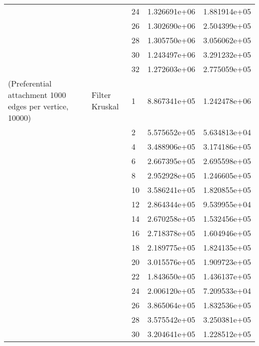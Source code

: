 \begin{tabular}{lllrr}
                      &                     & 24 &  1.326691e+06 &  1.881914e+05 \\
                      &                     & 26 &  1.302690e+06 &  2.504399e+05 \\
                      &                     & 28 &  1.305750e+06 &  3.056062e+05 \\
                      &                     & 30 &  1.243497e+06 &  3.291232e+05 \\
                      &                     & 32 &  1.272603e+06 &  2.775059e+05 \\
(Preferential attachment 1000 edges per vertice, 10000) & Filter Kruskal & 1  &  8.867341e+05 &  1.242478e+06 \\
                      &                     & 2  &  5.575652e+05 &  5.634813e+04 \\
                      &                     & 4  &  3.488906e+05 &  3.174186e+05 \\
                      &                     & 6  &  2.667395e+05 &  2.695598e+05 \\
                      &                     & 8  &  2.952928e+05 &  1.246605e+05 \\
                      &                     & 10 &  3.586241e+05 &  1.820855e+05 \\
                      &                     & 12 &  2.864344e+05 &  9.539955e+04 \\
                      &                     & 14 &  2.670258e+05 &  1.532456e+05 \\
                      &                     & 16 &  2.718378e+05 &  1.604946e+05 \\
                      &                     & 18 &  2.189775e+05 &  1.824135e+05 \\
                      &                     & 20 &  3.015576e+05 &  1.909723e+05 \\
                      &                     & 22 &  1.843650e+05 &  1.436137e+05 \\
                      &                     & 24 &  2.006120e+05 &  7.209533e+04 \\
                      &                     & 26 &  3.865064e+05 &  1.832536e+05 \\
                      &                     & 28 &  3.575542e+05 &  3.250381e+05 \\
                      &                     & 30 &  3.204641e+05 &  1.228512e+05 \\

\end{tabular}
